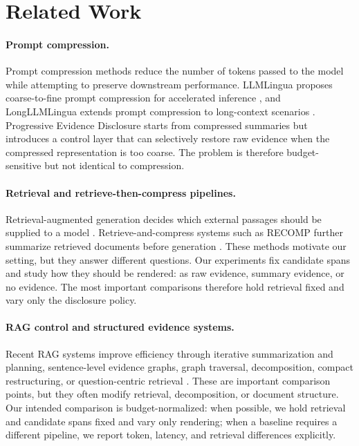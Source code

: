 \documentclass[11pt]{article}
\newcommand{\method}{Progressive Evidence Disclosure}
\begin{document}
\section{Related Work}

\paragraph{Prompt compression.}
Prompt compression methods reduce the number of tokens passed to the model while attempting to preserve downstream performance. LLMLingua proposes coarse-to-fine prompt compression for accelerated inference \citep{jiang2023llmlingua}, and LongLLMLingua extends prompt compression to long-context scenarios \citep{jiang2024longllmlingua}. \method{} starts from compressed summaries but introduces a control layer that can selectively restore raw evidence when the compressed representation is too coarse. The problem is therefore budget-sensitive but not identical to compression.

\paragraph{Retrieval and retrieve-then-compress pipelines.}
Retrieval-augmented generation decides which external passages should be supplied to a model \citep{lewis2020rag}. Retrieve-and-compress systems such as RECOMP further summarize retrieved documents before generation \citep{xu2024recomp}. These methods motivate our setting, but they answer different questions. Our experiments fix candidate spans and study how they should be rendered: as raw evidence, summary evidence, or no evidence. The most important comparisons therefore hold retrieval fixed and vary only the disclosure policy.

\paragraph{RAG control and structured evidence systems.}
Recent RAG systems improve efficiency through iterative summarization and planning, sentence-level evidence graphs, graph traversal, decomposition, compact restructuring, or question-centric retrieval \citep{jiang2024resp,ji2026retrievalreasoning,liang2026sentgraph,ni2025stepchain,ji2025dec,yang2026compactrag,lee2025questioncentric}. These are important comparison points, but they often modify retrieval, decomposition, or document structure. Our intended comparison is budget-normalized: when possible, we hold retrieval and candidate spans fixed and vary only rendering; when a baseline requires a different pipeline, we report token, latency, and retrieval differences explicitly.
\end{document}

